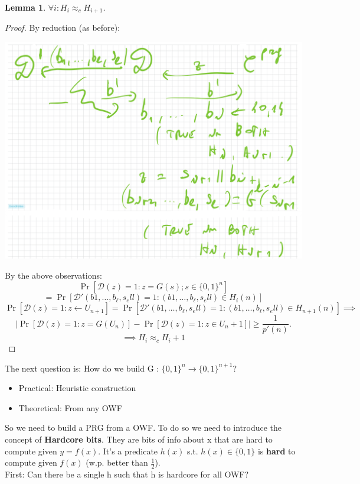 \documentclass[11pt, a4paper]{article}
\newtheorem{lem}{Lemma}
\begin{document}
\begin{lem}
    $\forall i : H_i \approx_c H_{i+1}$.
\end{lem}
\begin{proof}
    By reduction (as before):
    \begin{center}
        \includegraphics[scale=0.4]{img/Comp_sec/Reduction.png}
    \end{center}
    By the above observations:
    $$\Pr[\mathcal{D}(z) = 1: z = G(s); s \in \{0,1\}^n] $$
    $$= \Pr[\mathcal{D}'(b1,\dots,b_\ell,s_ell) = 1 : (b1,\dots,b_\ell,s_ell) \in H_i (n)]$$
    $$ \Pr[\mathcal{D}(z) = 1 : z \leftarrow U_{n+1}] = \Pr[\mathcal{D}' (b1,\dots,b_\ell,s_ell) = 1 : (b1,\dots,b_\ell,s_ell) \in H_{n+1}(n)] \implies $$
    $$ |\Pr[\mathcal{D}(z)=1 : z = G(U_n)] - \Pr[\mathcal{D}(z) = 1: z \in U_n+1]| \geq \frac{1}{p'(n)}.$$
    $$\implies H_i \approx_c H_i + 1$$
\end{proof}
The next question is: How do we build G : $\{0,1\}^n \rightarrow \{0,1\}^{n+1}$?\\
\begin{itemize}
    \item Practical: Heuristic construction
    \item Theoretical: From any OWF
\end{itemize}
So we need to build a PRG from a OWF. 
To do so we need to introduce the concept of \textbf{Hardcore bits}. They are bits of info about x that are hard to compute given $y=f(x)$.
It's a predicate $h(x)$ s.t. $h(x) \in \{0,1\}$ is \textbf{hard} to compute given $f(x)$ (w.p. better than $\frac{1}{2}$).\\
First: Can there be a single h such that h is hardcore for all OWF?\\
\end{document}
